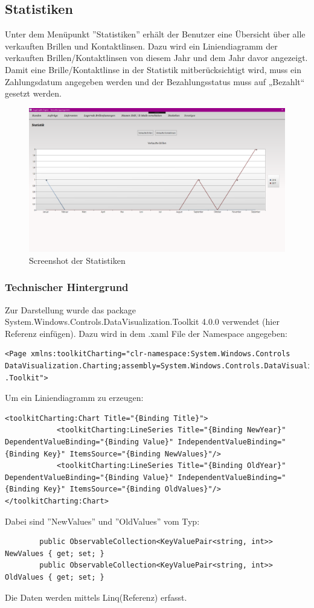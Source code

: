 \subsection{Statistiken}
Unter dem Menüpunkt ''Statistiken'' erhält der Benutzer eine Übersicht über alle verkauften Brillen und Kontaktlinsen. Dazu wird ein Liniendiagramm der verkauften Brillen/Kontaktlinsen von diesem Jahr und dem Jahr davor angezeigt. Damit eine Brille/Kontaktlinse in der Statistik mitberücksichtigt wird, muss ein Zahlungsdatum angegeben werden und der Bezahlungsstatus muss auf „Bezahlt“ gesetzt werden.
\begin{figure}[ht]
\begin{center}
	\includegraphics[scale=.25]{images/Statistiken.png}
\end{center}
	\caption{Screenshot der Statistiken}
	\label{fig:sample}
\end{figure}
\subsubsection{Technischer Hintergrund}
Zur Darstellung wurde das package System.Windows.Controls.DataVisualization.Toolkit 4.0.0 verwendet (hier Referenz einfügen). 
Dazu wird in dem .xaml File der Namespace angegeben: 
\begin{lstlisting}
<Page xmlns:toolkitCharting="clr-namespace:System.Windows.Controls
DataVisualization.Charting;assembly=System.Windows.Controls.DataVisualization
.Toolkit">
\end{lstlisting}
Um ein Liniendiagramm zu erzeugen:
\begin{lstlisting}
<toolkitCharting:Chart Title="{Binding Title}">
            <toolkitCharting:LineSeries Title="{Binding NewYear}"  DependentValueBinding="{Binding Value}" IndependentValueBinding="{Binding Key}" ItemsSource="{Binding NewValues}"/>
            <toolkitCharting:LineSeries Title="{Binding OldYear}"  DependentValueBinding="{Binding Value}" IndependentValueBinding="{Binding Key}" ItemsSource="{Binding OldValues}"/>
</toolkitCharting:Chart>
\end{lstlisting}
Dabei sind ''NewValues'' und ''OldValues'' vom Typ: 
\begin{lstlisting}
        public ObservableCollection<KeyValuePair<string, int>> NewValues { get; set; }
        public ObservableCollection<KeyValuePair<string, int>> OldValues { get; set; }
\end{lstlisting}
Die Daten werden mittels Linq(Referenz) erfasst.
